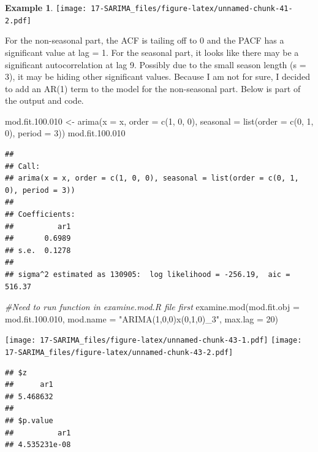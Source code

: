 \documentclass[
]{book}
\newenvironment{Shaded}{\begin{snugshade}}{\end{snugshade}}
\newcommand{\AttributeTok}[1]{\textcolor[rgb]{0.77,0.63,0.00}{#1}}
\newcommand{\CommentTok}[1]{\textcolor[rgb]{0.56,0.35,0.01}{\textit{#1}}}
\newcommand{\DecValTok}[1]{\textcolor[rgb]{0.00,0.00,0.81}{#1}}
\newcommand{\FloatTok}[1]{\textcolor[rgb]{0.00,0.00,0.81}{#1}}
\newcommand{\FunctionTok}[1]{\textcolor[rgb]{0.00,0.00,0.00}{#1}}
\newcommand{\NormalTok}[1]{#1}
\newcommand{\OtherTok}[1]{\textcolor[rgb]{0.56,0.35,0.01}{#1}}
\newcommand{\StringTok}[1]{\textcolor[rgb]{0.31,0.60,0.02}{#1}}
\theoremstyle{definition}
\theoremstyle{definition}
\newtheorem{example}{Example}[chapter]
\theoremstyle{definition}
\theoremstyle{definition}
\theoremstyle{remark}
\begin{document}
\begin{example}
\texttt{[image: 17-SARIMA\_files/figure-latex/unnamed-chunk-41-2.pdf]}

For the non-seasonal part, the ACF is tailing off to 0 and the PACF has a significant value at lag = 1. For the seasonal part, it looks like there may be a significant autocorrelation at lag 9. Possibly due to the small season length (s = 3), it may be hiding other significant values. Because I am not for sure, I decided to add an AR(1) term to the model for the non-seasonal part. Below is part of the output and code.

\begin{Shaded}
\begin{Highlighting}[]
\NormalTok{mod.fit.}\FloatTok{100.010} \OtherTok{\textless{}{-}} \FunctionTok{arima}\NormalTok{(}\AttributeTok{x =}\NormalTok{ x, }\AttributeTok{order =} \FunctionTok{c}\NormalTok{(}\DecValTok{1}\NormalTok{, }\DecValTok{0}\NormalTok{, }\DecValTok{0}\NormalTok{), }
    \AttributeTok{seasonal =} \FunctionTok{list}\NormalTok{(}\AttributeTok{order =} \FunctionTok{c}\NormalTok{(}\DecValTok{0}\NormalTok{, }\DecValTok{1}\NormalTok{, }\DecValTok{0}\NormalTok{), }\AttributeTok{period =} \DecValTok{3}\NormalTok{))}
\NormalTok{mod.fit.}\FloatTok{100.010}
\end{Highlighting}
\end{Shaded}

\begin{verbatim}
## 
## Call:
## arima(x = x, order = c(1, 0, 0), seasonal = list(order = c(0, 1, 0), period = 3))
## 
## Coefficients:
##          ar1
##       0.6989
## s.e.  0.1278
## 
## sigma^2 estimated as 130905:  log likelihood = -256.19,  aic = 516.37
\end{verbatim}

\begin{Shaded}
\begin{Highlighting}[]
\CommentTok{\#Need to run function in examine.mod.R file first}
\FunctionTok{examine.mod}\NormalTok{(}\AttributeTok{mod.fit.obj =}\NormalTok{ mod.fit.}\FloatTok{100.010}\NormalTok{, }\AttributeTok{mod.name =} 
    \StringTok{"ARIMA(1,0,0)x(0,1,0)\_3"}\NormalTok{, }\AttributeTok{max.lag =} \DecValTok{20}\NormalTok{)}
\end{Highlighting}
\end{Shaded}

\texttt{[image: 17-SARIMA\_files/figure-latex/unnamed-chunk-43-1.pdf]} \texttt{[image: 17-SARIMA\_files/figure-latex/unnamed-chunk-43-2.pdf]}

\begin{verbatim}
## $z
##      ar1 
## 5.468632 
## 
## $p.value
##          ar1 
## 4.535231e-08
\end{verbatim}


\end{example}
\end{document}

